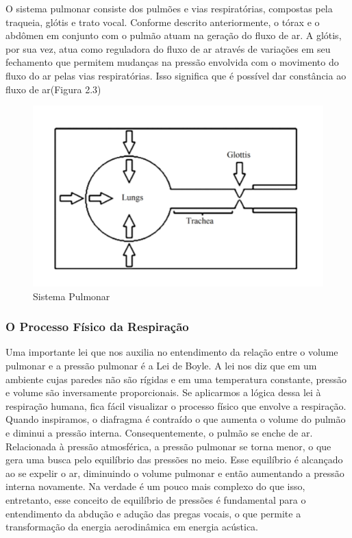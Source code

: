 	O sistema pulmonar consiste dos pulmões e vias respiratórias, compostas pela traqueia, glótis e trato vocal. Conforme descrito anteriormente, o tórax e o abdômen em conjunto com o pulmão atuam na geração do ﬂuxo de ar. A glótis, por sua vez, atua como reguladora do ﬂuxo de ar através de variações em seu fechamento que permitem mudanças na pressão envolvida com o movimento do ﬂuxo do ar pelas vias respiratórias. Isso signiﬁca que é possível dar constância ao ﬂuxo de ar(Figura 2.3)
	
	
	\begin{figure}
		\centering
		\includegraphics{pulmaoSimplificado.png}
		\caption{ Sistema Pulmonar~\cite{IngoTitze} }
		\label{fig:curvaTensaoDeformacao}
	\end{figure}
		
	\subsubsection{O Processo Físico da Respiração}
	Uma importante lei que nos auxilia no entendimento da relação entre o volume pulmonar e a pressão pulmonar é a Lei de Boyle. A lei nos diz que em um ambiente cujas paredes não são rígidas e em uma temperatura constante, pressão e volume são inversamente proporcionais. Se aplicarmos a lógica dessa lei à respiração humana, ﬁca fácil visualizar o processo físico que envolve a respiração. Quando inspiramos, o diafragma é contraído o que aumenta o volume do pulmão e diminui a pressão interna. Consequentemente, o pulmão se enche de ar. Relacionada à pressão atmosférica, a pressão pulmonar se torna menor, o que gera uma busca pelo equilíbrio das pressões no meio. Esse equilíbrio é alcançado ao se expelir o ar, diminuindo o volume pulmonar e então aumentando a pressão interna novamente. Na verdade é um pouco mais complexo do que isso, entretanto, esse conceito de equilíbrio de pressões é fundamental para o entendimento da abdução e adução das pregas vocais, o que permite a transformação da energia aerodinâmica em energia acústica.
	

